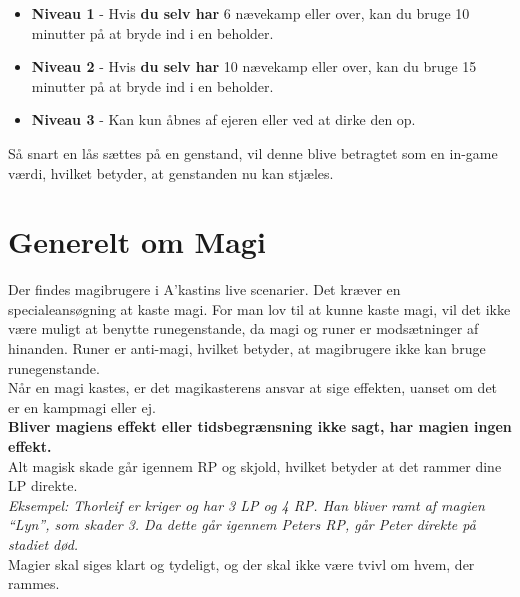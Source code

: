\begin{itemize}
    \item \textbf{Niveau 1} - Hvis \textbf{du selv har} 6 nævekamp eller over, kan du bruge 10 minutter på at bryde ind i en beholder.
    \item \textbf{Niveau 2} - Hvis \textbf{du selv har} 10 nævekamp eller over, kan du bruge 15 minutter på at bryde ind i en beholder.
    \item \textbf{Niveau 3} - Kan kun åbnes af ejeren eller ved at dirke den op.
\end{itemize}
Så snart en lås sættes på en genstand, vil denne blive betragtet som en in-game værdi, hvilket betyder, at genstanden nu kan stjæles.

\section*{Generelt om Magi}
Der findes magibrugere i A’kastins live scenarier. Det kræver en specialeansøgning at kaste magi.
For man lov til at kunne kaste magi, vil det ikke være muligt at benytte runegenstande, da magi og runer er modsætninger af hinanden. Runer er anti-magi, hvilket betyder, at magibrugere ikke kan bruge runegenstande.\\
Når en magi kastes, er det magikasterens ansvar at sige effekten, uanset om det er en kampmagi eller ej.\\ 
\textbf{Bliver magiens effekt eller tidsbegrænsning ikke sagt, har magien ingen effekt.}\\
Alt magisk skade går igennem RP og skjold, hvilket betyder at det rammer dine LP direkte.\\
\textit{Eksempel: Thorleif er kriger og har 3 LP og 4 RP. Han bliver ramt af magien “Lyn”, som skader 3. Da dette går igennem Peters RP, går Peter direkte på stadiet død.}\\
Magier skal siges klart og tydeligt, og der skal ikke være tvivl om hvem, der rammes.\\

